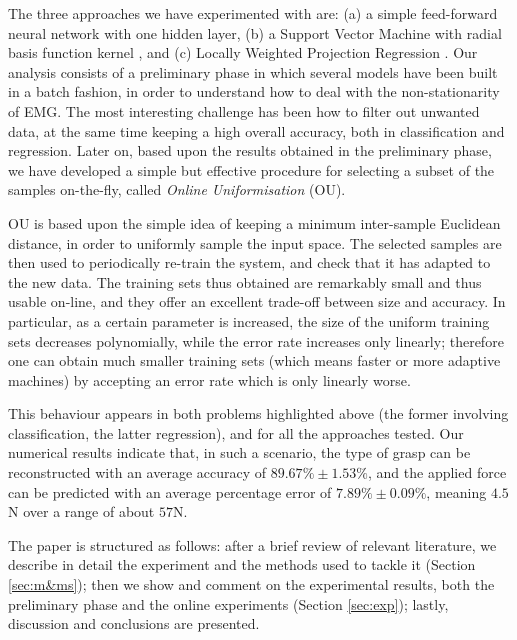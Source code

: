 The three approaches we have experimented with are:
(a) a simple feed-forward neural network with one hidden layer,
(b) a Support Vector Machine with radial basis function kernel
\cite{BGV92}, and (c) Locally Weighted Projection Regression
\cite{lwpr}. Our analysis consists of a preliminary phase in which
several models have been built in a batch fashion, in order to
understand how to deal with the non-stationarity of EMG. The most
interesting challenge has been how to filter out unwanted data, at the
same time keeping a high overall accuracy, both in classification and
regression. Later on, based upon the results obtained in the
preliminary phase, we have developed a simple but effective procedure
for selecting a subset of the samples on-the-fly, called \emph{Online
Uniformisation} (OU).

OU is based upon the simple idea of keeping a minimum inter-sample
Euclidean distance, in order to uniformly sample the input space. The
selected samples are then used to periodically re-train the system,
and check that it has adapted to the new data. The training sets thus
obtained are remarkably small and thus usable on-line, and they offer
an excellent trade-off between size and accuracy. In particular, as a
certain parameter is increased, the size of the uniform training sets
decreases polynomially, while the error rate increases only
linearly; therefore one can obtain much smaller training sets (which
means faster or more adaptive machines) by accepting an error rate
which is only linearly worse.

This behaviour appears in both problems highlighted above (the former
involving classification, the latter regression), and for all the
approaches tested. Our numerical results indicate that, in such a
scenario, the type of grasp can be reconstructed with an average
accuracy of $89.67\% \pm 1.53\%$, and the applied force can be
predicted with an average percentage error of $7.89\% \pm 0.09\%$,
meaning $4.5$N over a range of about $57$N.

The paper is structured as follows: after a brief review of relevant
literature, we describe in detail the experiment and the methods used
to tackle it (Section \ref{sec:m&ms}); then we show and comment on the
experimental results, both the preliminary phase and the online
experiments (Section \ref{sec:exp}); lastly, discussion and
conclusions are presented.
